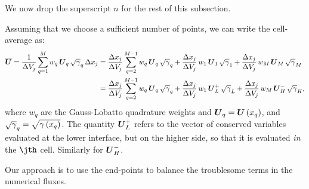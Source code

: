  We now drop the superscript $n$ for the rest of this subsection.

Assuming that we choose a sufficient number of points, we can write the cell-average as:
\begin{align}
    \overline{\boldsymbol{U}}=\frac{1}{\Delta V_{j}}\sum\limits_{q=1}^{M}w_{q}\,\boldsymbol{U}_{q}\,\sqrt{\gamma}_{q}\,\Delta x_{j}&=\frac{\Delta x_{j}}{\Delta V_{j}}\sum\limits_{q=2}^{M-1}w_{q}\,\boldsymbol{U}_{q}\,\sqrt{\gamma}_{q}+\frac{\Delta x_{j}}{\Delta V_{j}}\,w_{1}\,\boldsymbol{U}_{1}\,\sqrt{\gamma}_{1}+\frac{\Delta x_{j}}{\Delta V_{j}}\,w_{M}\,\boldsymbol{U}_{M}\,\sqrt{\gamma}_{M}\\
    &=\frac{\Delta x_{j}}{\Delta V_{j}}\sum\limits_{q=2}^{M-1}w_{q}\,\boldsymbol{U}_{q}\,\sqrt{\gamma}_{q}+\frac{\Delta x_{j}}{\Delta V_{j}}\,w_{1}\,\boldsymbol{U}^{+}_{L}\,\sqrt{\gamma}_{L}+\frac{\Delta x_{j}}{\Delta V_{j}}\,w_{M}\,\boldsymbol{U}^{-}_{H}\,\sqrt{\gamma}_{H},\label{Eq:CellAverageGL}
\end{align}
where $w_{q}$ are the Gauss-Lobatto quadrature weights and $\boldsymbol{U}_{q}=\boldsymbol{U}\left(x_{q}\right)$, and $\sqrt{\gamma}_{q}=\sqrt{\gamma\left(x_{q}\right)}$. The quantity $\boldsymbol{U}^{+}_{L}$ refers to the vector of conserved variables evaluated at the lower interface, but on the higher side, so that it is evaluated \textit{in} the $\jth$ cell. Similarly for $\boldsymbol{U}^{-}_{H}$.

Our approach is to use the end-points to balance the troublesome terms in the numerical fluxes.

